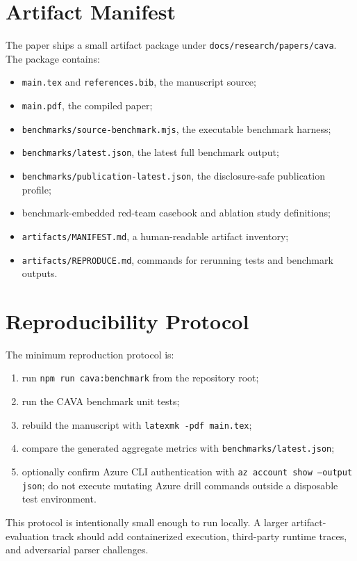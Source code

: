 \documentclass[11pt]{article}
\begin{document}
\section{Artifact Manifest}

The paper ships a small artifact package under \texttt{docs/research/papers/cava}. The package contains:

\begin{itemize}
  \item \texttt{main.tex} and \texttt{references.bib}, the manuscript source;
  \item \texttt{main.pdf}, the compiled paper;
  \item \texttt{benchmarks/source-benchmark.mjs}, the executable benchmark harness;
  \item \texttt{benchmarks/latest.json}, the latest full benchmark output;
  \item \texttt{benchmarks/publication-latest.json}, the disclosure-safe publication profile;
  \item benchmark-embedded red-team casebook and ablation study definitions;
  \item \texttt{artifacts/MANIFEST.md}, a human-readable artifact inventory;
  \item \texttt{artifacts/REPRODUCE.md}, commands for rerunning tests and benchmark outputs.
\end{itemize}

\section{Reproducibility Protocol}

The minimum reproduction protocol is:

\begin{enumerate}
  \item run \texttt{npm run cava:benchmark} from the repository root;
  \item run the CAVA benchmark unit tests;
  \item rebuild the manuscript with \texttt{latexmk -pdf main.tex};
  \item compare the generated aggregate metrics with \texttt{benchmarks/latest.json};
  \item optionally confirm Azure CLI authentication with \texttt{az account show --output json}; do not execute mutating Azure drill commands outside a disposable test environment.
\end{enumerate}

This protocol is intentionally small enough to run locally. A larger artifact-evaluation track should add containerized execution, third-party runtime traces, and adversarial parser challenges.
\end{document}
